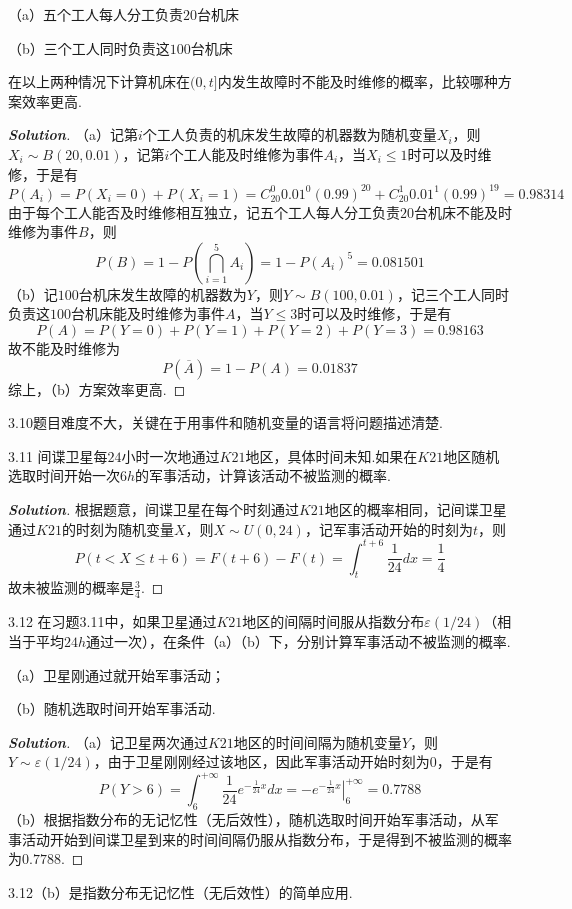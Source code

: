 \documentclass[10pt, a4paper, oneside]{ctexart}
\newenvironment{solution}{\begin{proof}[\bf Solution]}{\end{proof}}
\begin{document}
（a）五个工人每人分工负责$20$台机床

（b）三个工人同时负责这$100$台机床

在以上两种情况下计算机床在$(0,t]$内发生故障时不能及时维修的概率，比较哪种方案效率更高.

\begin{solution}
（a）记第$i$个工人负责的机床发生故障的机器数为随机变量$X_i$，则$X_i\sim B(20,0.01)$，记第$i$个工人能及时维修为事件$A_i$，当$X_i\leqslant 1$时可以及时维修，于是有
  \[P({A_i}) = P({X_i} = 0) + P({X_i} = 1) = C_{20}^0{0.01^0}{(0.99)^{20}} + C_{20}^1{0.01^1}{(0.99)^{19}} = 0.98314\]
  由于每个工人能否及时维修相互独立，记五个工人每人分工负责$20$台机床不能及时维修为事件$B$，则
  \[P(B) = 1 - P(\bigcap\limits_{i = 1}^5 {{A_i}} ) = 1 - P{({A_i})^5} = 0.081501\]  
（b）记$100$台机床发生故障的机器数为$Y$，则$Y\sim B(100,0.01)$，记三个工人同时负责这$100$台机床能及时维修为事件$A$，当$Y\leqslant 3$时可以及时维修，于是有
\[P(A) = P(Y = 0) + P(Y = 1) + P(Y = 2) + P(Y = 3) = 0.98163\]
故不能及时维修为
\[P(\overline A ) = 1 - P(A) = 0.01837\]
综上，（b）方案效率更高.
\end{solution}
\begin{remark}
3.10题目难度不大，关键在于用事件和随机变量的语言将问题描述清楚.
\end{remark}

3.11 间谍卫星每$24$小时一次地通过$K21$地区，具体时间未知.如果在$K21$地区随机选取时间开始一次$6h$的军事活动，计算该活动不被监测的概率.
\begin{solution}
根据题意，间谍卫星在每个时刻通过$K21$地区的概率相同，记间谍卫星通过$K21$的时刻为随机变量$X$，则$X\sim U(0,24)$，记军事活动开始的时刻为$t$，则
    \[P(t < X \leqslant t + 6) = F(t + 6) - F(t) = \int_t^{t + 6} {\frac{1}{{24}}dx}  = \frac{1}{4}\]
故未被监测的概率是$\frac{3}{4}$.
\end{solution}

3.12 在习题3.11中，如果卫星通过$K21$地区的间隔时间服从指数分布$\varepsilon(1/24)$（相当于平均$24h$通过一次），在条件（a）（b）下，分别计算军事活动不被监测的概率.

（a）卫星刚通过就开始军事活动；

（b）随机选取时间开始军事活动.

\begin{solution}
（a）记卫星两次通过$K21$地区的时间间隔为随机变量$Y$，则$Y\sim \varepsilon(1/24)$，由于卫星刚刚经过该地区，因此军事活动开始时刻为$0$，于是有
   \[P(Y > 6) = \int_6^{ + \infty } {\frac{1}{{24}}{e^{ - \frac{1}{{24}}x}}dx}  = \left. { - {e^{ - \frac{1}{{24}}x}}} \right|_6^{ + \infty } = 0.7788\]
（b）根据指数分布的无记忆性（无后效性），随机选取时间开始军事活动，从军事活动开始到间谍卫星到来的时间间隔仍服从指数分布，于是得到不被监测的概率为$0.7788$.
\end{solution}
\begin{remark}
3.12（b）是指数分布无记忆性（无后效性）的简单应用.
\end{remark}
\end{document}
